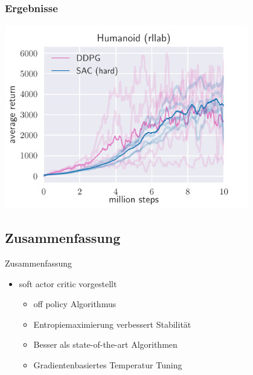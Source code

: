 \begin{frame}
    \frametitle{Ergebnisse}
    \includegraphics[width=0.8\textwidth]{figures/seeds-humanoid.pdf}
\end{frame}


\subsection{Zusammenfassung}
\begin{frame}{Zusammenfassung}
        \begin{itemize}
            \item soft actor critic vorgestellt
            \begin{itemize}
                \item off policy Algorithmus
                \item Entropiemaximierung verbessert Stabilität
                \item Besser als state-of-the-art Algorithmen 
                \item Gradientenbasiertes Temperatur Tuning
            \end{itemize} 
        \end{itemize}
\end{frame}


